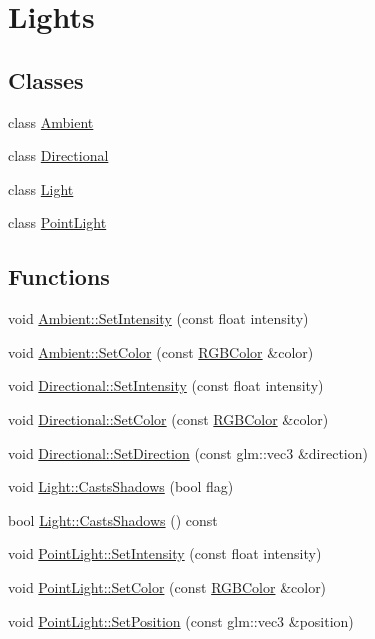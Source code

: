 \hypertarget{group___lights}{}\section{Lights}
\label{group___lights}
\subsection*{Classes}
\begin{DoxyCompactItemize}
\item 
class \hyperlink{class_ambient}{Ambient}
\item 
class \hyperlink{class_directional}{Directional}
\item 
class \hyperlink{class_light}{Light}
\item 
class \hyperlink{class_point_light}{Point\+Light}
\end{DoxyCompactItemize}
\subsection*{Functions}
\begin{DoxyCompactItemize}
\item 
void \hyperlink{group___lights_ga5aefcac18f63a3923320e634daff4f57}{Ambient\+::\+Set\+Intensity} (const float intensity)
\item 
void \hyperlink{group___lights_gaac238172e351af4e5b302b0a006bf719}{Ambient\+::\+Set\+Color} (const \hyperlink{class_r_g_b_color}{R\+G\+B\+Color} \&color)
\item 
void \hyperlink{group___lights_gaa916930bad1e02ef24f89039151be8cd}{Directional\+::\+Set\+Intensity} (const float intensity)
\item 
void \hyperlink{group___lights_ga460c4d38eba389fd8e13d994249bbafc}{Directional\+::\+Set\+Color} (const \hyperlink{class_r_g_b_color}{R\+G\+B\+Color} \&color)
\item 
void \hyperlink{group___lights_ga497358d0a37e4a87d5e24f286695c0a6}{Directional\+::\+Set\+Direction} (const glm\+::vec3 \&direction)
\item 
void \hyperlink{group___lights_ga87d9f95e8a6d77b8fd8383b68daa23ff}{Light\+::\+Casts\+Shadows} (bool flag)
\item 
bool \hyperlink{group___lights_gad1397ab09ba91ed92dbbeb0c8fa8bedc}{Light\+::\+Casts\+Shadows} () const
\item 
void \hyperlink{group___lights_ga1d97c3f6d636899b719d5014f74b3530}{Point\+Light\+::\+Set\+Intensity} (const float intensity)
\item 
void \hyperlink{group___lights_ga27c17e299711f7131091c714b837f619}{Point\+Light\+::\+Set\+Color} (const \hyperlink{class_r_g_b_color}{R\+G\+B\+Color} \&color)
\item 
void \hyperlink{group___lights_ga21b458bf745d4fe52a62e503a4fb3d24}{Point\+Light\+::\+Set\+Position} (const glm\+::vec3 \&position)
\end{DoxyCompactItemize}


